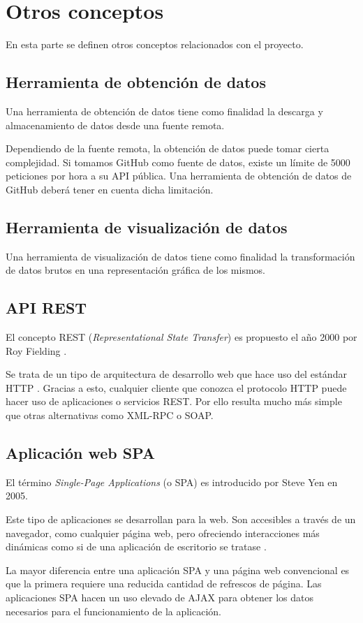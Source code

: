 \section{Otros conceptos}

En esta parte se definen otros conceptos relacionados con el proyecto.

\subsection{Herramienta de obtención de datos}

Una herramienta de obtención de datos tiene como finalidad la descarga y almacenamiento de datos desde una fuente remota.

Dependiendo de la fuente remota, la obtención de datos puede tomar cierta complejidad. Si tomamos GitHub como fuente de datos, existe un límite de 5000 peticiones por hora a su API pública. Una herramienta de obtención de datos de GitHub deberá tener en cuenta dicha limitación.

\subsection{Herramienta de visualización de datos}

Una herramienta de visualización de datos tiene como finalidad la transformación de datos brutos en una representación gráfica de los mismos.

\subsection{API REST}

El concepto REST (\emph{Representational State Transfer}) es propuesto el año 2000 por Roy Fielding \cite{fielding2000architectural}.

Se trata de un tipo de arquitectura de desarrollo web que hace uso del estándar HTTP \cite{asiermarques:rest}. Gracias a esto, cualquier cliente que conozca el protocolo HTTP puede hacer uso de aplicaciones o servicios REST. Por ello resulta mucho más simple que otras alternativas como XML-RPC o SOAP.

\subsection{Aplicación web SPA}

El término \emph{Single-Page Applications} (o SPA) es introducido por Steve Yen en 2005. 

Este tipo de aplicaciones se desarrollan para la web. Son accesibles a través de un navegador, como cualquier página web, pero ofreciendo interacciones más dinámicas como si de una aplicación de escritorio se tratase \cite{codeschool:spa}.

La mayor diferencia entre una aplicación SPA y una página web convencional es que la primera requiere una reducida cantidad de refrescos de página. Las aplicaciones SPA hacen un uso elevado de AJAX para obtener los datos necesarios para el funcionamiento de la aplicación. 